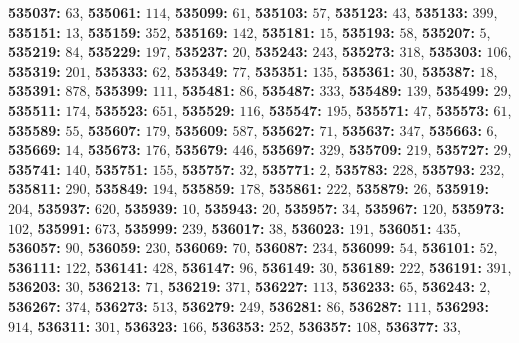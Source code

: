 \textsf{\bfseries 535037:} $63$, \textsf{\bfseries 535061:} $114$, \textsf{\bfseries 535099:} $61$, \textsf{\bfseries 535103:} $57$, \textsf{\bfseries 535123:} $43$, \textsf{\bfseries 535133:} $399$, \textsf{\bfseries 535151:} $13$, \textsf{\bfseries 535159:} $352$, \textsf{\bfseries 535169:} $142$, \textsf{\bfseries 535181:} $15$, \textsf{\bfseries 535193:} $58$, \textsf{\bfseries 535207:} $5$, \textsf{\bfseries 535219:} $84$, \textsf{\bfseries 535229:} $197$, \textsf{\bfseries 535237:} $20$, \textsf{\bfseries 535243:} $243$, \textsf{\bfseries 535273:} $318$, \textsf{\bfseries 535303:} $106$, \textsf{\bfseries 535319:} $201$, \textsf{\bfseries 535333:} $62$, \textsf{\bfseries 535349:} $77$, \textsf{\bfseries 535351:} $135$, \textsf{\bfseries 535361:} $30$, \textsf{\bfseries 535387:} $18$, \textsf{\bfseries 535391:} $878$, \textsf{\bfseries 535399:} $111$, \textsf{\bfseries 535481:} $86$, \textsf{\bfseries 535487:} $333$, \textsf{\bfseries 535489:} $139$, \textsf{\bfseries 535499:} $29$, \textsf{\bfseries 535511:} $174$, \textsf{\bfseries 535523:} $651$, \textsf{\bfseries 535529:} $116$, \textsf{\bfseries 535547:} $195$, \textsf{\bfseries 535571:} $47$, \textsf{\bfseries 535573:} $61$, \textsf{\bfseries 535589:} $55$, \textsf{\bfseries 535607:} $179$, \textsf{\bfseries 535609:} $587$, \textsf{\bfseries 535627:} $71$, \textsf{\bfseries 535637:} $347$, \textsf{\bfseries 535663:} $6$, \textsf{\bfseries 535669:} $14$, \textsf{\bfseries 535673:} $176$, \textsf{\bfseries 535679:} $446$, \textsf{\bfseries 535697:} $329$, \textsf{\bfseries 535709:} $219$, \textsf{\bfseries 535727:} $29$, \textsf{\bfseries 535741:} $140$, \textsf{\bfseries 535751:} $155$, \textsf{\bfseries 535757:} $32$, \textsf{\bfseries 535771:} $2$, \textsf{\bfseries 535783:} $228$, \textsf{\bfseries 535793:} $232$, \textsf{\bfseries 535811:} $290$, \textsf{\bfseries 535849:} $194$, \textsf{\bfseries 535859:} $178$, \textsf{\bfseries 535861:} $222$, \textsf{\bfseries 535879:} $26$, \textsf{\bfseries 535919:} $204$, \textsf{\bfseries 535937:} $620$, \textsf{\bfseries 535939:} $10$, \textsf{\bfseries 535943:} $20$, \textsf{\bfseries 535957:} $34$, \textsf{\bfseries 535967:} $120$, \textsf{\bfseries 535973:} $102$, \textsf{\bfseries 535991:} $673$, \textsf{\bfseries 535999:} $239$, \textsf{\bfseries 536017:} $38$, \textsf{\bfseries 536023:} $191$, \textsf{\bfseries 536051:} $435$, \textsf{\bfseries 536057:} $90$, \textsf{\bfseries 536059:} $230$, \textsf{\bfseries 536069:} $70$, \textsf{\bfseries 536087:} $234$, \textsf{\bfseries 536099:} $54$, \textsf{\bfseries 536101:} $52$, \textsf{\bfseries 536111:} $122$, \textsf{\bfseries 536141:} $428$, \textsf{\bfseries 536147:} $96$, \textsf{\bfseries 536149:} $30$, \textsf{\bfseries 536189:} $222$, \textsf{\bfseries 536191:} $391$, \textsf{\bfseries 536203:} $30$, \textsf{\bfseries 536213:} $71$, \textsf{\bfseries 536219:} $371$, \textsf{\bfseries 536227:} $113$, \textsf{\bfseries 536233:} $65$, \textsf{\bfseries 536243:} $2$, \textsf{\bfseries 536267:} $374$, \textsf{\bfseries 536273:} $513$, \textsf{\bfseries 536279:} $249$, \textsf{\bfseries 536281:} $86$, \textsf{\bfseries 536287:} $111$, \textsf{\bfseries 536293:} $914$, \textsf{\bfseries 536311:} $301$, \textsf{\bfseries 536323:} $166$, \textsf{\bfseries 536353:} $252$, \textsf{\bfseries 536357:} $108$, \textsf{\bfseries 536377:} $33$, 
